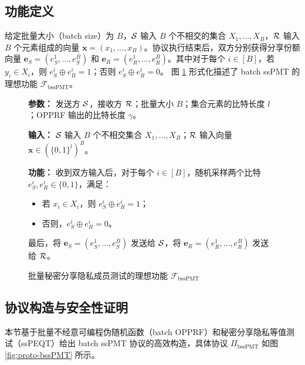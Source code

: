 \subsection{功能定义}

给定批量大小（batch size）为 $B$，$\mathcal{S}$ 输入 $B$ 个不相交的集合 $X_1, \dots, X_B$，$\mathcal{R}$ 输入 $B$ 个元素组成的向量 $\textbf{x} = (x_1, \dots, x_B)$。协议执行结束后，双方分别获得分享份额向量 $\textbf{e}_S = (e_S^1, \dots, e_S^B)$ 和 $\textbf{e}_R = (e_R^1, \dots, e_R^B)$。其中对于每个 $i \in [B]$，若 $y_i \in X_i$，则 $e_S^i \oplus e_R^i = 1$；否则 $e_S^i \oplus e_R^i = 0$。
图 \ref{fig:func-bssPMT} 形式化描述了 batch ssPMT 的理想功能 $\mathcal{F}_{\text{bssPMT}}$。

\begin{figure}[!htb]
\centering
\begin{framed}
\begin{trivlist}
    \item \textbf{参数：} 发送方 $\mathcal{S}$，接收方 $\mathcal{R}$；批量大小 $B$；集合元素的比特长度 $l$；OPPRF 输出的比特长度 $\gamma$。
    \item \textbf{输入：} $\mathcal{S}$ 输入 $B$ 个不相交集合 $X_1, \dots, X_B$；$\mathcal{R}$ 输入向量 $\textbf{x} \in (\{0,1\}^l)^B$。
    \item \textbf{功能：} 收到双方输入后，对于每个 $i \in [B]$，随机采样两个比特 $e_S^i, e_R^i \in \{0,1\}$，满足：
    \begin{itemize}[itemsep=2pt,topsep=0pt,parsep=0pt,leftmargin=10pt]
        \item 若 $x_i \in X_i$，则 $e_S^i \oplus e_R^i = 1$；
        \item 否则，$e_S^i \oplus e_R^i = 0$。
    \end{itemize}
    最后，将 $\textbf{e}_S = (e_S^1, \dots, e_S^B)$ 发送给 $\mathcal{S}$，将 $\textbf{e}_R = (e_R^1, \dots, e_R^B)$ 发送给 $\mathcal{R}$。
\end{trivlist}
\end{framed}
\caption{批量秘密分享隐私成员测试的理想功能 $\mathcal{F}_{\text{bssPMT}}$}\label{fig:func-bssPMT}
\end{figure}

\subsection{协议构造与安全性证明}

本节基于批量不经意可编程伪随机函数（batch OPPRF）和秘密分享隐私等值测试（ssPEQT）给出 batch ssPMT 协议的高效构造，具体协议 $\Pi_{\text{bssPMT}}$ 如图 \ref{fig:proto-bssPMT} 所示。 

